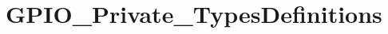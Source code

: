 \hypertarget{group___g_p_i_o___private___types_definitions}{\section{G\-P\-I\-O\-\_\-\-Private\-\_\-\-Types\-Definitions}
\label{group___g_p_i_o___private___types_definitions}
}
